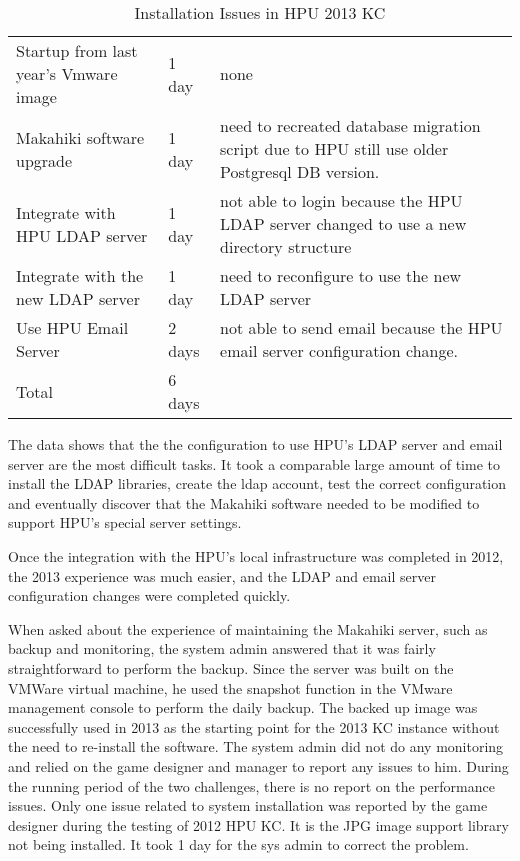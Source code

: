 \begin{table}[ht!]
  \centering
  \begin{tabular}{|P{0.28\columnwidth}|P{0.1\columnwidth}|p{0.5\columnwidth}|}
    \hline
      &
      &
      \\
    \hline
     Startup from last year's Vmware image & 1 day &  none\\
    \hline
     Makahiki software upgrade & 1 day & need to recreated database migration script due to HPU still use older Postgresql DB version. \\
    \hline
    Integrate with HPU LDAP server & 1 day  & not able to login because the HPU LDAP server changed to use a new directory structure \\
    \hline
     Integrate with the new LDAP server &  1 day &  need to reconfigure to use the new LDAP server\\
    \hline
    Use HPU Email Server & 2 days & not able to send email because the HPU email server configuration change. \\
    \hline
    Total & 6 days & \\
    \hline \end{tabular}
  \caption{Installation Issues in HPU 2013 KC }
  \label{fig:makahiki-install-hpu2013}
\end{table}

The data shows that the the configuration to use HPU's LDAP server and email server are the most difficult tasks. It took a comparable large amount of time to install the LDAP libraries, create the ldap account, test the correct configuration and eventually discover that the Makahiki software needed to be modified to support HPU's special server settings. 

Once the integration with the HPU's local infrastructure was completed in 2012, the 2013 experience was much easier, and the LDAP and email server configuration changes were completed quickly. 

When asked about the experience of maintaining the Makahiki server, such as backup and monitoring, the system admin answered that it was fairly straightforward to perform the backup. Since the server was built on the VMWare virtual machine, he used the snapshot function in the VMware management console to perform the daily backup. The backed up image was successfully used in 2013 as the starting point for the 2013 KC instance without the need to re-install the software. The system admin did not do any monitoring and relied on the game designer and manager to report any issues to him. During the running period of the two challenges, there is no report on the performance issues. Only one issue related to system installation was reported by the game designer during the testing of 2012 HPU KC. It is the JPG image support library not being installed. It took 1 day for the sys admin to correct the problem.


